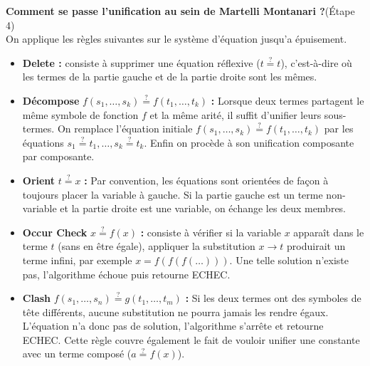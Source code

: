 \documentclass[11pt]{article}
\begin{document}
\newpage
\vspace{0.2cm}
\textbf{Comment se passe l'unification au sein de Martelli Montanari ?}(Étape 4)\\
On applique les règles suivantes sur le système d'équation jusqu'a épuisement.
\begin{itemize}
\vspace{0.2cm}
\item \noindent \textbf{Delete :} consiste à supprimer une équation réflexive ($t \overset{?}{=} t$), c'est-à-dire où les termes de la partie gauche et de la partie droite sont les mêmes.

\vspace{0.2cm}
\item \noindent \textbf{Décompose} $f(s_1, \dots, s_k) \overset{?}{=} f(t_1, \dots, t_k)$ \textbf{:} Lorsque deux termes partagent le même symbole de fonction $f$ et la même arité, il suffit d'unifier leurs sous-termes. On remplace l'équation initiale $f(s_1, \dots, s_k) \overset{?}{=} f(t_1, \dots, t_k)$ par les équations $s_1 \overset{?}{=} t_1, \dots, s_k \overset{?}{=} t_k$. Enfin on procède à son unification composante par composante.

\vspace{0.2cm}
\item \noindent \textbf{Orient} $t \overset{?}{=} x$ \textbf{:} Par convention, les équations sont orientées de façon à toujours placer la variable à gauche. Si la partie gauche est un terme non-variable et la partie droite est une variable, on échange les deux membres.

\vspace{0.2cm}
\item \noindent \textbf{Occur Check} $x \overset{?}{=} f(x)$ \textbf{:} consiste à vérifier si la variable $x$ apparaît dans le terme $t$ (sans en être égale), appliquer la substitution $x \to t$ produirait un terme infini, par exemple $x = f(f(f(\dots)))$. Une telle solution n'existe pas, l'algorithme échoue puis retourne ECHEC.

\vspace{0.2cm}
\item \noindent \textbf{Clash} $f(s_1, \dots, s_n) \overset{?}{=} g(t_1, \dots, t_m)$ \textbf{:} Si les deux termes ont des symboles de tête différents, aucune substitution ne pourra jamais les rendre égaux. L'équation n'a donc pas de solution, l'algorithme s'arrête et retourne ECHEC. Cette règle couvre également le fait de vouloir unifier une constante avec un terme composé ($a \overset{?}{=} f(x)$).
\end{itemize}
\end{document}
